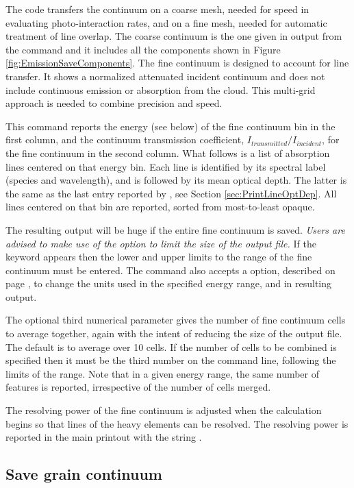 The code transfers the continuum on a coarse mesh, needed for speed in
evaluating photo-interaction rates, and on a fine mesh, needed for automatic
treatment of line overlap.
The coarse continuum is the one given in output
from the  command and it includes all the components shown in Figure \ref{fig:EmissionSaveComponents}.
The fine continuum is designed to account for line transfer.
It shows a normalized attenuated incident continuum and 
does not include continuous
emission or absorption from the cloud.  
This multi-grid approach is needed to combine precision and speed.

This command reports the energy (see below) of the fine continuum bin in the
first column, and the continuum transmission coefficient,
$I_{transmitted}/I_{incident}$, for the fine continuum in the second column.
What follows is a list of absorption lines centered on that energy bin.
Each line is identified by its spectral label (species and wavelength), and is
followed by its mean optical depth.
The latter is the same as the last entry reported by
, see Section \ref{sec:PrintLineOptDep}.
All lines centered on that bin are reported, sorted from most-to-least opaque.

The resulting output will be huge if the entire fine continuum is saved.
{\it Users are advised to make use of the {\rm{}} option
to limit the size of the output file.}
If the keyword  appears then
the lower and upper limits to the range
of the fine continuum must be entered.
The command also accepts
a  option,
described on page \pageref{output_units}, to change the units used
in the specified energy range, and in resulting output.

The optional third numerical parameter gives the number
of fine continuum cells to average together, again with the intent of
reducing the size of the output file.  The default is to average over 10
cells.  If the number of cells to be combined is specified then it must
be the third number on the command line, following the limits
of the range.
Note that in a given energy range, the same number of features is reported,
irrespective of the number of cells merged.

The resolving power of the fine continuum is adjusted when the calculation begins so
that lines of the heavy elements can be resolved.
The resolving power is reported in the main printout with the string
.

\subsection{Save grain continuum}

